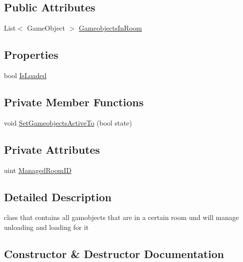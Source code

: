 \subsection*{Public Attributes}
\begin{DoxyCompactItemize}
\item 
List$<$ Game\+Object $>$ \mbox{\hyperlink{class_room_managment_unit_afb66a8eafa5ec0399e83b670ed2db21f}{Gameobjects\+In\+Room}}
\end{DoxyCompactItemize}
\subsection*{Properties}
\begin{DoxyCompactItemize}
\item 
bool \mbox{\hyperlink{class_room_managment_unit_a221d94b284d9888e753699938f9e7809}{Is\+Loaded}}
\end{DoxyCompactItemize}
\subsection*{Private Member Functions}
\begin{DoxyCompactItemize}
\item 
void \mbox{\hyperlink{class_room_managment_unit_ae39467cac522f23c198693c215968ad7}{Set\+Gameobjects\+Active\+To}} (bool state)
\end{DoxyCompactItemize}
\subsection*{Private Attributes}
\begin{DoxyCompactItemize}
\item 
uint \mbox{\hyperlink{class_room_managment_unit_a3a8836466231ec4cc95a2328cf246a75}{Managed\+Room\+ID}}
\end{DoxyCompactItemize}


\subsection{Detailed Description}
class that contains all gamobjects that are in a certain room und will manage unloading and loading for it 



\subsection{Constructor \& Destructor Documentation}
\mbox{\label{class_room_managment_unit_ad9c4cf6c496f32f6e0edbe47a4bf0295}} 

